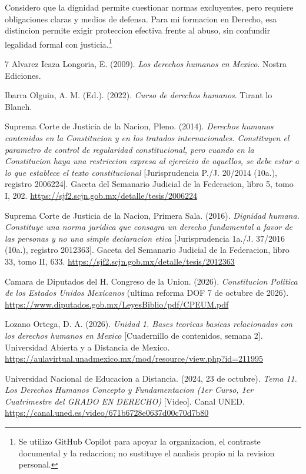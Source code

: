 \documentclass[12pt,spanish,letterpaper,oneside]{article}
\begin{document}
Considero que la dignidad permite cuestionar normas excluyentes, pero
requiere obligaciones claras y medios de defensa. Para mi formacion
en Derecho, esa distincion permite exigir proteccion efectiva frente
al abuso, sin confundir legalidad formal con justicia.\footnote{Se utilizo
GitHub Copilot para apoyar la organizacion, el contraste documental y
la redaccion; no sustituye el analisis propio ni la revision personal.}

\clearpage
\begin{thebibliography}{7}
Alvarez Icaza Longoria, E. (2009). \emph{Los derechos humanos en Mexico}.
Nostra Ediciones.

Ibarra Olguin, A. M. (Ed.). (2022). \emph{Curso de derechos humanos}.
Tirant lo Blanch.

Suprema Corte de Justicia de la Nacion, Pleno. (2014).
\emph{Derechos humanos contenidos en la Constitucion y en los tratados
internacionales. Constituyen el parametro de control de regularidad
constitucional, pero cuando en la Constitucion haya una restriccion
expresa al ejercicio de aquellos, se debe estar a lo que establece el
texto constitucional} [Jurisprudencia P./J. 20/2014 (10a.), registro 2006224].
Gaceta del Semanario Judicial de la Federacion, libro 5, tomo I, 202.
\url{https://sjf2.scjn.gob.mx/detalle/tesis/2006224}

Suprema Corte de Justicia de la Nacion, Primera Sala. (2016).
\emph{Dignidad humana. Constituye una norma juridica que consagra un
derecho fundamental a favor de las personas y no una simple declaracion
etica} [Jurisprudencia 1a./J. 37/2016 (10a.), registro 2012363].
Gaceta del Semanario Judicial de la Federacion, libro 33, tomo II, 633.
\url{https://sjf2.scjn.gob.mx/detalle/tesis/2012363}

Camara de Diputados del H. Congreso de la Union. (2026).
\emph{Constitucion Politica de los Estados Unidos Mexicanos}
(ultima reforma DOF 7 de octubre de 2026).
\url{https://www.diputados.gob.mx/LeyesBiblio/pdf/CPEUM.pdf}

Lozano Ortega, D. A. (2026). \emph{Unidad 1. Bases teoricas basicas
relacionadas con los derechos humanos en Mexico}
[Cuadernillo de contenidos, semana 2]. Universidad Abierta y a Distancia de Mexico.
\url{https://aulavirtual.unadmexico.mx/mod/resource/view.php?id=211995}

Universidad Nacional de Educacion a Distancia. (2024, 23 de octubre).
\emph{Tema 11. Los Derechos Humanos Concepto y Fundamentacion
(1er Curso, 1er Cuatrimestre del GRADO EN DERECHO)} [Video]. Canal UNED.
\url{https://canal.uned.es/video/671b6728e0637d00c70d7b80}
\end{thebibliography}
\end{document}
